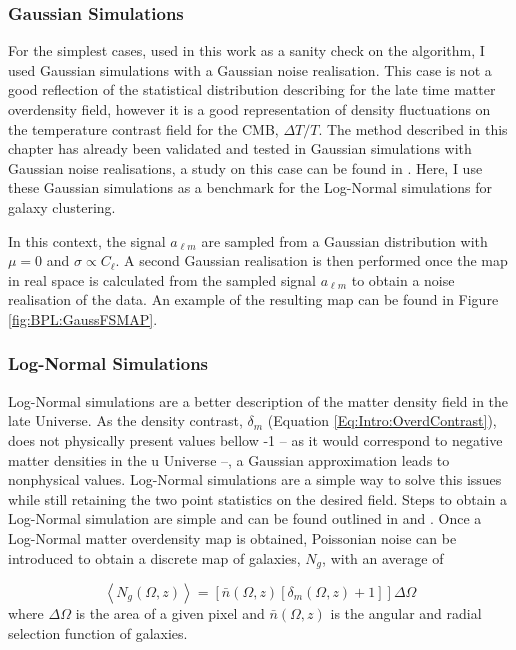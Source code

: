 \subsubsection{Gaussian Simulations}
For the simplest cases, used in this work as a sanity check on the algorithm, I used Gaussian simulations with a Gaussian noise realisation. This case is not a good reflection of the statistical distribution describing for the late time matter overdensity field, however it is a good representation of density fluctuations on the temperature contrast field for the CMB, $\Delta T/T$. The method described in this chapter has already been validated and tested in Gaussian simulations with Gaussian noise realisations, a study on this case can be found in \cite{SreeThesis}. Here, I use these Gaussian simulations as a benchmark for the Log-Normal simulations for galaxy clustering.

\qquad In this context, the signal $a_{\ell m}$ are sampled from a Gaussian distribution with $\mu = 0$ and $\sigma \propto C_{\ell}$. A second Gaussian realisation is then performed once the map in real space is calculated from the sampled signal $a_{\ell m}$ to obtain a noise realisation of the data. An example of the resulting map can be found in Figure \ref{fig:BPL:GaussFSMAP}.

\subsubsection{Log-Normal Simulations}
Log-Normal simulations are a better description of the matter density field in the late Universe. As the density contrast, $\delta_m$ (Equation \ref{Eq:Intro:OverdContrast}), does not physically present values bellow -1 -- as it would correspond to negative matter densities in the u
Universe --, a Gaussian approximation leads to nonphysical values. Log-Normal simulations are a simple way to solve this issues while still retaining the two point statistics on the desired field. Steps to obtain a Log-Normal simulation are simple and can be found outlined in \cite{LoureiroMestrado} and \cite{Flask2016}. Once a Log-Normal matter overdensity map is obtained, Poissonian noise can be introduced to obtain a discrete map of galaxies, $N_{g}$, with an average of

\begin{equation}
\label{Eq:Poiss}
\left\langle N_g(\Omega,z) \right\rangle = \left[\bar{n}(\Omega,z)\left[ \delta_m (\Omega,z) + 1 \right] \right]\Delta\Omega
\end{equation}
where $\Delta\Omega$ is the area of a given pixel and $\bar{n}(\Omega,z)$ is the angular and radial selection function of galaxies. 

